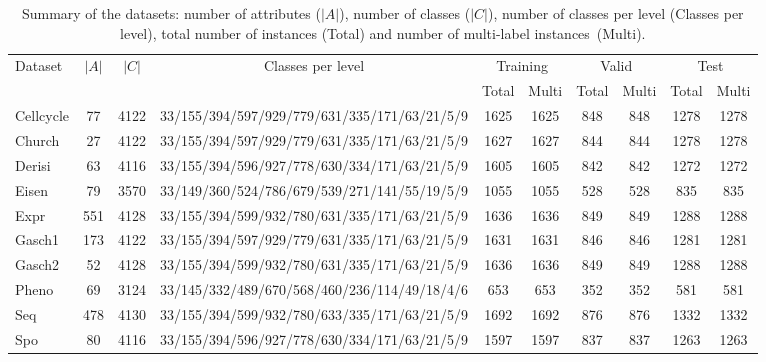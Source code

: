 \begin{table*}[htpb]
\centering
\setlength{\tabcolsep}{6pt}
\caption{Summary of the datasets: number of attributes ($|A|$), number of classes ($|C|$), number of classes per level (Classes per level), total number of instances (Total) and number of multi-label instances~(Multi).}
\scriptsize
\begin{tabular*}{\textwidth}
    {@{\extracolsep{\fill}}lccccccccc}
\toprule
\multirow{2}{*}{Dataset} & \multirow{2}{*}{$|A|$}  & \multirow{2}{*}{$|C|$} & \multirow{2}{*}{Classes per level} & \multicolumn{ 2}{c}{Training} & \multicolumn{ 2}{c}{Valid} &  \multicolumn{ 2}{c}{Test} \\ 
 & & & & Total & Multi & Total & Multi & Total & Multi \\ \midrule
 
Cellcycle &  77  &  4122  & 33/155/394/597/929/779/631/335/171/63/21/5/9 & 1625  & 1625   &  848  &  848  &  1278  & 1278   \\

Church    &  27  &  4122  & 33/155/394/597/929/779/631/335/171/63/21/5/9 & 1627  &  1627  &  844  & 844  &  1278  & 1278 \\

Derisi    &  63  &  4116  & 33/155/394/596/927/778/630/334/171/63/21/5/9 & 1605  & 1605   &  842  &  842  &  1272  &  1272 \\

Eisen     &  79  &  3570  & 33/149/360/524/786/679/539/271/141/55/19/5/9 & 1055  &  1055  &  528  &  528  &  835  & 835 \\
  
Expr      &  551 &  4128  & 33/155/394/599/932/780/631/335/171/63/21/5/9 & 1636  &  1636  &  849  &  849  &  1288  & 1288 \\
  
Gasch1    &  173 &  4122  & 33/155/394/597/929/779/631/335/171/63/21/5/9 & 1631  &  1631  &  846  &  846  &  1281  & 1281 \\
  
Gasch2    &  52  &  4128  & 33/155/394/599/932/780/631/335/171/63/21/5/9 & 1636  &  1636  &  849  &  849  &  1288  & 1288 \\
  
Pheno     &  69  &  3124  & 33/145/332/489/670/568/460/236/114/49/18/4/6 & 653  &  653  &  352  &  352  &  581  & 581 \\
    
Seq       &  478 &  4130 & 33/155/394/599/932/780/633/335/171/63/21/5/9 & 1692  &  1692  &  876  &  876  &  1332   &  1332 \\
  
Spo       &  80  & 4116  & 33/155/394/596/927/778/630/334/171/63/21/5/9 & 1597  &  1597  & 837  &  837  &  1263  & 1263 \\
 
\bottomrule  
  
\end{tabular*}
\label{tab:datasets}
\end{table*}

